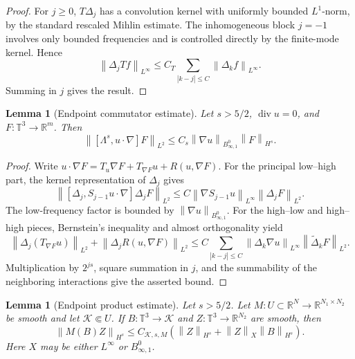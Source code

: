 \documentclass[11pt]{article}
\numberwithin{equation}{section}
\newtheorem{lemma}[theorem]{Lemma}
\newcommand{\T}{\mathbb T}
\newcommand{\R}{\mathbb R}
\newcommand{\divv}{\operatorname{div}}
\newcommand{\norm}[1]{\left\lVert #1\right\rVert}
\begin{document}
\begin{proof}
For \(j\ge0\), \(T\Delta_j\) has a convolution kernel with uniformly bounded
\(L^1\)-norm, by the standard rescaled Mihlin estimate.  The inhomogeneous
block \(j=-1\) involves only bounded frequencies and is controlled directly
by the finite-mode kernel.  Hence
\[
  \norm{\Delta_jTf}_{L^\infty}
  \le
  C_T\sum_{|k-j|\le C}\norm{\Delta_kf}_{L^\infty}.
\]
Summing in \(j\) gives the result.
\end{proof}

\begin{lemma}[Endpoint commutator estimate]
\label{lem:appendix-commutator}
Let \(s>5/2\), \(\divv u=0\), and \(F:\T^3\to\R^m\).  Then
\[
  \norm{[\Lambda^s,u\cdot\nabla]F}_{L^2}
  \le
  C_s\norm{\nabla u}_{B^0_{\infty,1}}\norm{F}_{H^s}.
\]
\end{lemma}

\begin{proof}
Write \(u\cdot\nabla F=T_u\nabla F+T_{\nabla F}u+R(u,\nabla F)\).  For the
principal low--high part, the kernel representation of \(\Delta_j\) gives
\[
  \norm{[\Delta_j,S_{j-1}u\cdot\nabla]\Delta_jF}_{L^2}
  \le
  C\norm{\nabla S_{j-1}u}_{L^\infty}\norm{\Delta_jF}_{L^2}.
\]
The low-frequency factor is bounded by
\(\norm{\nabla u}_{B^0_{\infty,1}}\).  For the high--low and high--high
pieces, Bernstein's inequality and almost orthogonality yield
\[
  \norm{\Delta_j(T_{\nabla F}u)}_{L^2}
  +
  \norm{\Delta_jR(u,\nabla F)}_{L^2}
  \le
  C\sum_{|k-j|\le C}
  \norm{\Delta_k\nabla u}_{L^\infty}
  \norm{\widetilde\Delta_kF}_{L^2}.
\]
Multiplication by \(2^{js}\), square summation in \(j\), and the summability of
the neighboring interactions give the asserted bound.
\end{proof}

\begin{lemma}[Endpoint product estimate]
\label{lem:appendix-product}
Let \(s>5/2\).  Let \(M:U\subset\R^N\to\R^{N_1\times N_2}\) be smooth and let
\(\mathcal K\Subset U\).  If \(B:\T^3\to\mathcal K\) and
\(Z:\T^3\to\R^{N_2}\) are smooth, then
\[
  \norm{M(B)Z}_{H^s}
  \le
  C_{\mathcal K,s,M}
  \left(
  \norm{Z}_{H^s}
  +\norm{Z}_{X}\norm{B}_{H^s}
  \right).
\]
Here \(X\) may be either \(L^\infty\) or \(B^0_{\infty,1}\).
\end{lemma}
\end{document}
